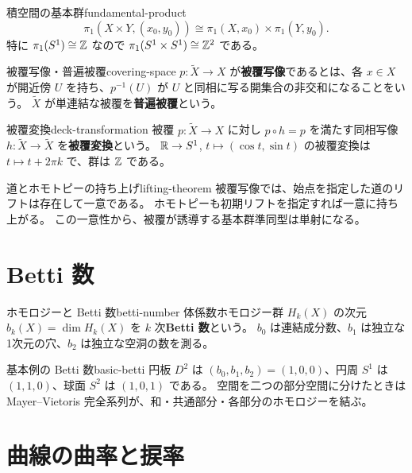 \begin{theorem}{積空間の基本群}{fundamental-product}
\[
 \pi_1(X\times Y,(x_0,y_0))
 \cong\pi_1(X,x_0)\times\pi_1(Y,y_0).
\]
特に $\pi_1(S^1)\cong\mathbb{Z}$ なので $\pi_1(S^1\times S^1)\cong\mathbb{Z}^2$ である。
\end{theorem}

\begin{definition}{被覆写像・普遍被覆}{covering-space}
$p:\widetilde X\to X$ が\textbf{被覆写像}であるとは、各 $x\in X$ が開近傍 $U$ を持ち、$p^{-1}(U)$ が $U$ と同相に写る開集合の非交和になることをいう。
$\widetilde X$ が単連結な被覆を\textbf{普遍被覆}という。
\end{definition}

\begin{definition}{被覆変換}{deck-transformation}
被覆 $p:\widetilde X\to X$ に対し $p\circ h=p$ を満たす同相写像 $h:\widetilde X\to\widetilde X$ を\textbf{被覆変換}という。
$\mathbb{R}\to S^1$, $t\mapsto(\cos t,\sin t)$ の被覆変換は $t\mapsto t+2\pi k$ で、群は $\mathbb{Z}$ である。
\end{definition}

\begin{theorem}{道とホモトピーの持ち上げ}{lifting-theorem}
被覆写像では、始点を指定した道のリフトは存在して一意である。
ホモトピーも初期リフトを指定すれば一意に持ち上がる。
この一意性から、被覆が誘導する基本群準同型は単射になる。
\end{theorem}

\section{Betti 数}

\begin{definition}{ホモロジーと Betti 数}{betti-number}
体係数ホモロジー群 $H_k(X)$ の次元
$b_k(X)=\dim H_k(X)$ を $k$ 次\textbf{Betti 数}という。
$b_0$ は連結成分数、$b_1$ は独立な1次元の穴、$b_2$ は独立な空洞の数を測る。
\end{definition}

\begin{theorem}{基本例の Betti 数}{basic-betti}
円板 $D^2$ は $(b_0,b_1,b_2)=(1,0,0)$、円周 $S^1$ は $(1,1,0)$、球面 $S^2$ は $(1,0,1)$ である。
空間を二つの部分空間に分けたときは Mayer--Vietoris 完全系列が、和・共通部分・各部分のホモロジーを結ぶ。
\end{theorem}

\section{曲線の曲率と捩率}

